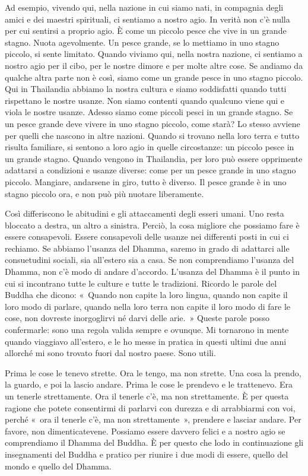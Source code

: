 Ad esempio, vivendo qui, nella nazione in cui siamo nati, in compagnia
degli amici e dei maestri spirituali, ci sentiamo a nostro agio. In
verità non c'è nulla per cui sentirsi a proprio agio. È come un piccolo
pesce che vive in un grande stagno. Nuota agevolmente. Un pesce grande,
se lo mettiamo in uno stagno piccolo, si sente limitato. Quando viviamo
qui, nella nostra nazione, ci sentiamo a nostro agio per il cibo, per le
nostre dimore e per molte altre cose. Se andiamo da qualche altra parte
non è così, siamo come un grande pesce in uno stagno piccolo. Qui in
Thailandia abbiamo la nostra cultura e siamo soddisfatti quando tutti
rispettano le nostre usanze. Non siamo contenti quando qualcuno viene
qui e viola le nostre usanze. Adesso siamo come piccoli pesci in un
grande stagno. Se un pesce grande deve vivere in uno stagno piccolo,
come starà? Lo stesso avviene per quelli che nascono in altre nazioni.
Quando si trovano nella loro terra e tutto risulta familiare, si sentono
a loro agio in quelle circostanze: un piccolo pesce in un grande stagno.
Quando vengono in Thailandia, per loro può essere opprimente adattarsi a
condizioni e usanze diverse: come per un pesce grande in uno stagno
piccolo. Mangiare, andarsene in giro, tutto è diverso. Il pesce grande è
in uno stagno piccolo ora, e non può più nuotare liberamente.

Così differiscono le abitudini e gli attaccamenti degli esseri umani.
Uno resta bloccato a destra, un altro a sinistra. Perciò, la cosa
migliore che possiamo fare è essere consapevoli. Essere consapevoli
delle usanze nei differenti posti in cui ci rechiamo. Se abbiamo
l'usanza del Dhamma, saremo in grado di adattarci alle consuetudini
sociali, sia all'estero sia a casa. Se non comprendiamo l'usanza del
Dhamma, non c'è modo di andare d'accordo. L'usanza del Dhamma è il punto
in cui si incontrano tutte le culture e tutte le tradizioni. Ricordo le
parole del Buddha che dicono: «~Quando non capite la loro lingua, quando
non capite il loro modo di parlare, quando nella loro terra non capite
il loro modo di fare le cose, non dovreste inorgoglirvi né darvi delle
arie.~» Queste parole posso confermarle: sono una regola valida sempre e
ovunque. Mi tornarono in mente quando viaggiavo all'estero, e le ho
messe in pratica in questi ultimi due anni allorché mi sono trovato
fuori dal nostro paese. Sono utili.

Prima le cose le tenevo strette. Ora le tengo, ma non strette. Una cosa
la prendo, la guardo, e poi la lascio andare. Prima le cose le prendevo
e le trattenevo. Era un tenerle strettamente. Ora il tenerle c'è, ma non
strettamente. È per questa ragione che potete consentirmi di parlarvi
con durezza e di arrabbiarmi con voi, perché «~ora il tenerle c'è, ma
non strettamente~», prendere e lasciar andare. Per favore, non
dimenticatevene. Possiamo essere davvero felici e a nostro agio se
comprendiamo il Dhamma del Buddha. È per questo che lodo in
continuazione gli insegnamenti del Buddha e pratico per riunire i due
modi di essere, quello del mondo e quello del Dhamma.

